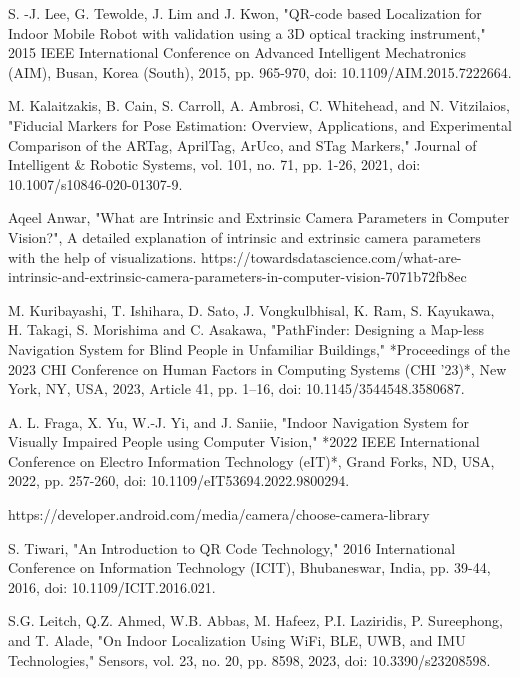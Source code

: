 \begin{thebibliography}{9}
	S. -J. Lee, G. Tewolde, J. Lim and J. Kwon, "QR-code based Localization for Indoor Mobile Robot with validation using a 3D optical tracking instrument," 2015 IEEE International Conference on Advanced Intelligent Mechatronics (AIM), Busan, Korea (South), 2015, pp. 965-970, doi: 10.1109/AIM.2015.7222664.
	
	M. Kalaitzakis, B. Cain, S. Carroll, A. Ambrosi, C. Whitehead, and N. Vitzilaios, "Fiducial Markers for Pose Estimation: Overview, Applications, and Experimental Comparison of the ARTag, AprilTag, ArUco, and STag Markers," Journal of Intelligent \& Robotic Systems, vol. 101, no. 71, pp. 1-26, 2021, doi: 10.1007/s10846-020-01307-9.
	
	Aqeel Anwar, "What are Intrinsic and Extrinsic Camera Parameters in Computer Vision?", A detailed explanation of intrinsic and extrinsic camera parameters with the help of visualizations.
	https://towardsdatascience.com/what-are-intrinsic-and-extrinsic-camera-parameters-in-computer-vision-7071b72fb8ec
	
	M. Kuribayashi, T. Ishihara, D. Sato, J. Vongkulbhisal, K. Ram, S. Kayukawa, H. Takagi, S. Morishima and C. Asakawa, "PathFinder: Designing a Map-less Navigation System for Blind People in Unfamiliar Buildings," *Proceedings of the 2023 CHI Conference on Human Factors in Computing Systems (CHI '23)*, New York, NY, USA, 2023, Article 41, pp. 1–16, doi: 10.1145/3544548.3580687.
	
	A. L. Fraga, X. Yu, W.-J. Yi, and J. Saniie, "Indoor Navigation System for Visually Impaired People using Computer Vision," *2022 IEEE International Conference on Electro Information Technology (eIT)*, Grand Forks, ND, USA, 2022, pp. 257-260, doi: 10.1109/eIT53694.2022.9800294.
	
	https://developer.android.com/media/camera/choose-camera-library
	
	S. Tiwari, "An Introduction to QR Code Technology," 2016 International Conference on Information Technology (ICIT), Bhubaneswar, India, pp. 39-44, 2016, doi: 10.1109/ICIT.2016.021.
	
	 S.G. Leitch, Q.Z. Ahmed, W.B. Abbas, M. Hafeez, P.I. Laziridis, P. Sureephong, and T. Alade, "On Indoor Localization Using WiFi, BLE, UWB, and IMU Technologies," Sensors, vol. 23, no. 20, pp. 8598, 2023, doi: 10.3390/s23208598.
	

\end{thebibliography}
